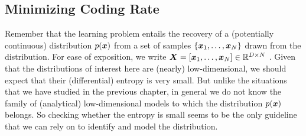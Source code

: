 \documentclass[../../book-main.tex]{subfiles}
\begin{document}




\subsection{Minimizing Coding Rate}\label{sub:min_entropy}
Remember that the learning problem entails the recovery of a (potentially continuous)  distribution $p(\bm{x})$ from a set of samples $\{\bm{x}_1, \ldots, \bm{x}_N\}$ drawn from the distribution. For ease of exposition, we write $\bm{X} = [\bm{x}_1, \ldots, \bm{x}_N] \in \mathbb{R}^{D\times N}$ . Given that the distributions of interest here are (nearly) low-dimensional, we should expect that their (differential) entropy is very small. But unlike the situations that we have studied in the previous chapter, in general we do not know the family of (analytical) low-dimensional models to which the distribution $p(\bm{x})$ belongs. So checking whether the entropy is small seems to be the only guideline that we can rely on to identify and model the distribution.
\end{document}

